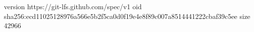 version https://git-lfs.github.com/spec/v1
oid sha256:ecd11025128976a566e5b2f5ca0d0f19e4e8f89c007a8514441222cbaf39c5ee
size 42966
